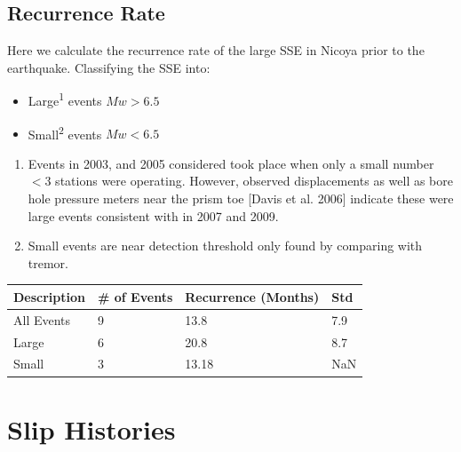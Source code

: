 \documentclass[a0,landscape]{a0poster}
\begin{document}
\begin{multicols}{5}
\subsection*{Recurrence Rate}

Here we calculate the recurrence rate of the large SSE in Nicoya prior to the earthquake. Classifying the SSE into:
\begin{itemize}
 \item Large\textsuperscript{1} events  $Mw>6.5$
 \item Small\textsuperscript{2} events  $Mw<6.5$ 
\end{itemize} 

\begin{footnotesize}
\begin{enumerate}
\itemsep0em
\item Events in 2003, and 2005 considered took place when only a small number $<3$ stations were operating. However, observed displacements as well as bore hole pressure meters near the prism toe [Davis et al. 2006] indicate these were large events consistent with  in 2007 and 2009.
\item Small events are near detection threshold only found by comparing with tremor.
\end{enumerate}
\end{footnotesize}
\vspace{0.2cm}
\begin{center}
\begin{tabular}{l l l l}
	\toprule
	\textbf{Description} & \textbf{\# of Events} & \textbf{Recurrence (Months)} & \textbf{Std}\\
	\midrule
	All Events & 9 & 13.8 & 7.9\\
	Large & 6 & 20.8 & 8.7\\
	Small & 3 & 13.18 & NaN \\
	\bottomrule
\end{tabular}
\end{center}


\section*{Slip Histories}


\end{multicols}
\end{document}

